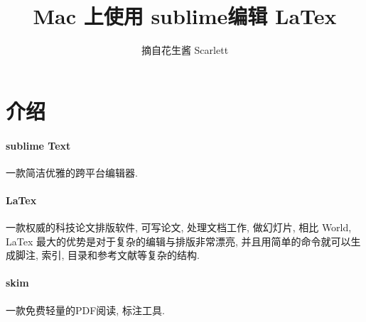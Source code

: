 \documentclass[12pt]{article}
\title{Mac 上使用 sublime编辑 LaTex}
\author{摘自花生酱 Scarlett}
\begin{document}
\maketitle
\newpage
\newpage

\section{介绍}
\paragraph{sublime Text}一款简洁优雅的跨平台编辑器.
\paragraph{LaTex}一款权威的科技论文排版软件, 可写论文, 处理文档工作, 做幻灯片, 相比 World, LaTex 最大的优势是对于复杂的编辑与排版非常漂亮, 并且用简单的命令就可以生成脚注, 索引, 目录和参考文献等复杂的结构.
\paragraph{skim}一款免费轻量的PDF阅读, 标注工具.
\end{document}
